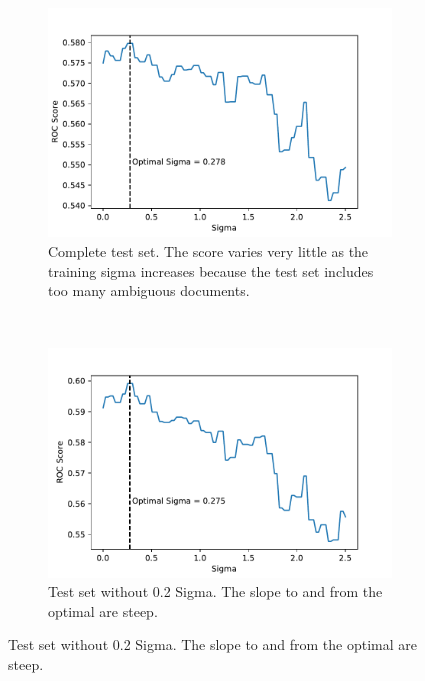 \documentclass[12pt,a4paper]{report}
\begin{document}
\begin{figure}
    \centering
    \begin{subfigure}[b]{0.49\textwidth}
        \includegraphics[width=\textwidth]{imgs/180531_Sigma_fixed_test_00.pdf}
        \caption{Complete test set. The score varies very little as the training sigma increases because the test set includes too many ambiguous documents.}
        \label{fig:}
    \end{subfigure}
    ~ %
    \begin{subfigure}[b]{0.49\textwidth}
        \includegraphics[width=\textwidth]{imgs/180531_Sigma_fixed_test_02.pdf}
        \caption{Test set without 0.2 Sigma. The slope to and from the optimal are steep.\linebreak }
        \label{fig:}

\end{subfigure}
\end{figure}
\end{document}
